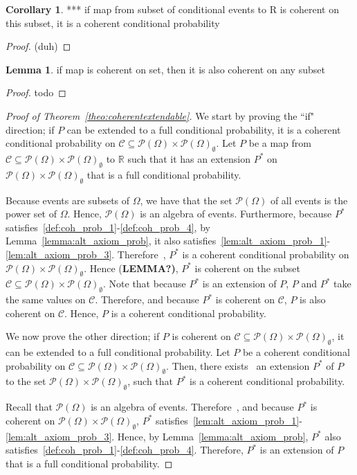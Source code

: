 \documentclass[10pt]{paper}
\theoremstyle{definition}
\newtheorem{corollary}[theorem]{Corollary}
\newtheorem{lemma}[theorem]{Lemma}
\newcommand{\reals}{\mathbb{R}}
\newcommand{\paths}{\Omega}
\newcommand{\power}{\mathcal{P}(\paths)}
\newcommand{\nonemptypower}{\power_{\emptyset}}
\begin{document}
\begin{corollary}
*** if map from subset of conditional events to R is coherent on this subset, it is a coherent conditional probability
\end{corollary}
\begin{proof}
(duh)
\end{proof}

\begin{lemma}
if map is coherent on set, then it is also coherent on any subset
\end{lemma}
\begin{proof}
todo
\end{proof}

\begin{proof}[Proof of Theorem~\ref{theo:coherentextendable}]
We start by proving the ``if" direction; if $P$ can be extended to a full conditional probability, it is a coherent conditional probability on $\mathcal{C}\subseteq\power\times\nonemptypower$. Let $P$ be a map from $\mathcal{C}\subseteq\power\times\nonemptypower$ to $\reals$ such that it has an extension $P^*$ on $\power\times\nonemptypower$ that is a full conditional probability. 

Because events are subsets of $\Omega$, we have that the set $\power$ of all events is the power set of $\Omega$. Hence, $\power$ is an algebra of events. Furthermore, because $P^*$ satisfies~\ref{def:coh_prob_1}-\ref{def:coh_prob_4}, by Lemma~\ref{lemma:alt_axiom_prob}, it also satisfies~\ref{lem:alt_axiom_prob_1}-\ref{lem:alt_axiom_prob_3}. Therefore~\cite{berti1991coherent}, $P^*$ is a coherent conditional probability on $\power\times\nonemptypower$. Hence {(\bf LEMMA?)}, $P^*$ is coherent on the subset $\mathcal{C}\subseteq\power\times\nonemptypower$. Note that because $P^*$ is an extension of $P$, $P$ and $P^*$ take the same values on $\mathcal{C}$. Therefore, and because $P^*$ is coherent on $\mathcal{C}$, $P$ is also coherent on $\mathcal{C}$. Hence, $P$ is a coherent conditional probability.

We now prove the other direction; if $P$ is coherent on $\mathcal{C}\subseteq\power\times\nonemptypower$, it can be extended to a full conditional probability.
Let $P$ be a coherent conditional probability on $\mathcal{C}\subseteq\power\times\nonemptypower$. Then, there exists~\cite[Theorem 4]{regazzini1985finitely} an extension $P^*$ of $P$ to the set $\power\times\nonemptypower$, such that $P^*$ is a coherent conditional probability.

Recall that $\power$ is an algebra of events. Therefore~\cite{berti1991coherent}, and because $P^*$ is coherent on $\power\times\nonemptypower$, $P^*$ satisfies~\ref{lem:alt_axiom_prob_1}-\ref{lem:alt_axiom_prob_3}. Hence, by Lemma~\ref{lemma:alt_axiom_prob}, $P^*$ also satisfies~\ref{def:coh_prob_1}-\ref{def:coh_prob_4}. Therefore, $P^*$ is an extension of $P$ that is a full conditional probability.
\end{proof}
\end{document}
